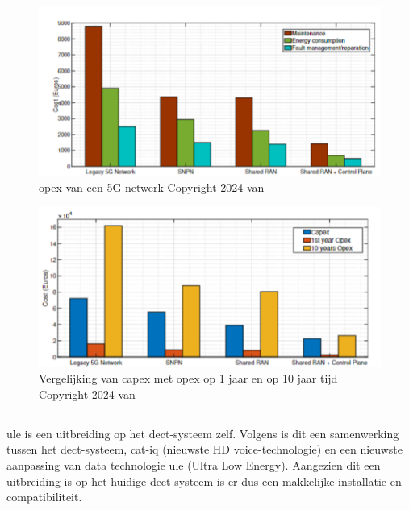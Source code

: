 \begin{figure}[H]
  \includegraphics[width=\linewidth]{../graphics/opex.png}
  \caption{\gls{opex} van een 5G netwerk \autocite[Door][]{Hilary2024} Copyright 2024 van \textcite{Hilary2024}}
  \label{fig:opex}
\end{figure}

\begin{figure}[H]
  \includegraphics[width=\linewidth]{../graphics/capex-opex.png}
  \caption{Vergelijking van \gls{capex} met \gls{opex} op 1 jaar en op 10 jaar tijd \autocite[Door][]{Hilary2024} Copyright 2024 van \textcite{Hilary2024}}
  \label{fig:capex-vs-opex}
\end{figure}

\subsection{}%
\label{sec:ule}%

\gls{ule} is een uitbreiding op het \gls{dect}-systeem zelf. Volgens \textcite{GariniDil2014} is dit een samenwerking tussen het \gls{dect}-systeem, \gls{cat-iq} (nieuwste HD voice-technologie) en een nieuwste aanpassing van data technologie \gls{ule} (Ultra Low Energy). Aangezien dit een uitbreiding is op het huidige \gls{dect}-systeem is er dus een makkelijke installatie en compatibiliteit.

